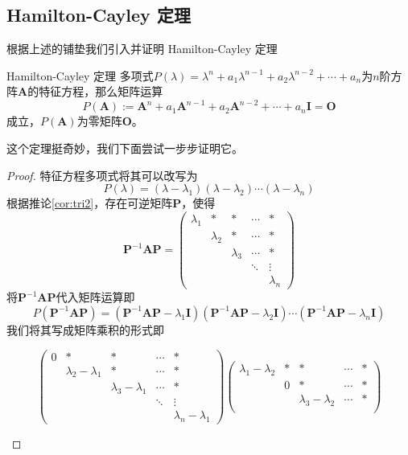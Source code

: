 \subsection{Hamilton-Cayley 定理}

根据上述的铺垫我们引入并证明 Hamilton-Cayley 定理

\begin{theorem}{Hamilton-Cayley 定理}
	多项式$P(\lambda)=\lambda^n+a_1\lambda^{n-1}+a_2\lambda^{n-2}+\cdots+a_n$为$n$阶方阵$\mathbf{A}$的特征方程，那么矩阵运算$$P(\mathbf{A}):=\mathbf{A}^n+a_1\mathbf{A}^{n-1}+a_2\mathbf{A}^{n-2}+\cdots+a_n\mathbf{I}=\mathbf{O}$$成立，$P(\mathbf{A})$为零矩阵$\mathbf{O}$。
\end{theorem}

这个定理挺奇妙，我们下面尝试一步步证明它。

\begin{proof}
	特征方程多项式将其可以改写为
	$$
   	P(\lambda) = (\lambda - \lambda_1)(\lambda - \lambda_2) \cdots (\lambda - \lambda_n)
   	$$根据推论\ref{cor:tri2}，存在可逆矩阵$\mathbf{P}$，使得$$\mathbf{P}^{-1} \mathbf{A} \mathbf{P}=\begin{pmatrix}
 \lambda_1 & * & * & \cdots & *\\
  & \lambda_2 & * & \cdots & *\\
  &  & \lambda_3 & \cdots & *\\
  &  &  & \ddots & \vdots \\ 
  &  &  &  & \lambda_n
\end{pmatrix}$$将$\mathbf{P}^{-1} \mathbf{A} \mathbf{P}$代入矩阵运算即$$P(\mathbf{P}^{-1} \mathbf{A} \mathbf{P})=(\mathbf{P}^{-1} \mathbf{A} \mathbf{P} - \lambda_1\mathbf{I})(\mathbf{P}^{-1} \mathbf{A} \mathbf{P} - \lambda_2\mathbf{I}) \cdots (\mathbf{P}^{-1} \mathbf{A} \mathbf{P} - \lambda_n\mathbf{I})$$我们将其写成矩阵乘积的形式即\begin{tiny}
$$\begin{pmatrix}
 0 & * & * & \cdots & *\\
  & \lambda_2-\lambda_1 & * & \cdots & *\\
  &  & \lambda_3-\lambda_1 & \cdots & *\\
  &  &  & \ddots & \vdots \\ 
  &  &  &  & \lambda_n-\lambda_1
\end{pmatrix}\begin{pmatrix}
  \lambda_1-\lambda_2 & * & * & \cdots & *\\
  & 0 & * & \cdots & *\\
  &  & \lambda_3-\lambda_2 & \cdots & *\\

\end{pmatrix}$$
\end{tiny}
\end{proof}
